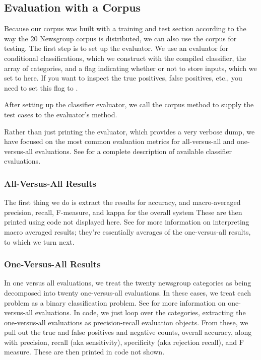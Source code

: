 \subsection{Evaluation with a Corpus}\label{section:naive-bayes-corpus-eval}

Because our corpus was built with a training and test section
according to the way the 20 Newsgroup corpus is distributed, we can
also use the corpus for testing.  The first step is to set up the
evaluator.  
%
%
We use an evaluator for conditional classifications, which
we construct with the compiled classifier, the array of categories, and
a flag indicating whether or not to store inputs, which we set to
 here.  If you want to inspect the true positives, false
positives, etc., you need to set this flag to .  

After setting up the classifier evaluator, we call the corpus
method  to supply the test cases to the 
evaluator's  method.  

Rather than just printing the evaluator, which provides a very verbose
dump, we have focused on the most common evaluation metrics for
all-versus-all and one-versus-all evaluations.  See
 for a complete description of
available classifier evaluations.

\subsubsection{All-Versus-All Results}

The first thing we do is extract the results for accuracy,
and macro-averaged precision, recall, F-measure, and kappa
for the overall system
%
%
These are then printed using code not displayed here.  See
 for more information on
interpreting macro averaged results; they're essentially averages
of the one-versus-all results, to which we turn next.


\subsubsection{One-Versus-All Results}

In one versus all evaluations, we treat the twenty newsgroup
categories as being decomposed into twenty one-versus-all evaluations.
In these cases, we treat each problem as a binary classification problem.
See  for more information on
one-versus-all evaluations.  In code, we just loop over the
categories, extracting the one-versus-all evaluations as
precision-recall evaluation objects.
%
%
From these, we pull out the true and false positives and negative
counts, overall accuracy, along with precision, recall (aka sensitivity),
specificity (aka rejection recall), and F measure.  These are then
printed in code not shown.

